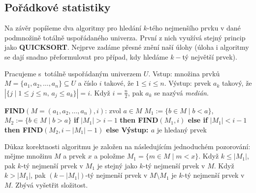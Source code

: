 \documentclass[a4paper,12pt]{article}
\begin{document}
\subsection{Pořádkové statistiky}

Na závěr popíšeme dva algoritmy pro hledání $
k$-tého 
nejmenší\-ho prvku v dané podmnožině totálně 
uspořádané\-ho univerza. Prv\-ní z nich využívá  
stejný princip jako {\bf QUICKSORT}. Nejprve zadáme 
přesné zně\-ní naší úlohy (úloha i algoritmy se dají 
snadno přeformulovat pro případ, kdy hledáme $k-$tý 
největší prvek).

Pracujeme s~totálně uspořádaným univerzem $
U$.\newline 
Vstup: množina prvků $M=\{a_1,a_2,\dots,a_n\}\subseteq 
U$ a číslo $i$ takové, 
že $1\le i\le n$.\newline 
Výstup: prvek $a_k$ takový, že 
$|\{j\mid 1\le j\le n,\,a_j\le a_k\}|=i$.\newline 
Když $i=\frac n2$, pak $a_k$ se nazývá \emph{medián}.

{\bf FIND$(M=(a_1,a_2,\dots,a_n),i)$}:\newline 
zvol $a\in M$\newline
$M_1:=\{b\in M\mid b<a\}$, 
$M_2:=\{b\in M\mid b>a\}$\newline 
{\bf if} $|M_1|>i-1$ {\bf then\newline 
\phantom{{\rm ---}}FIND$(M_1,i)$\newline 
else\newline 
\phantom{{\rm ---}}if} $|M_1|<i-1$ {\bf then\newline 
\phantom{{\rm ------}}FIND$(M_2,i-|M_1|-1)$\newline 
\phantom{{\rm ---}}else\newline 
\phantom{{\rm------}}Výstup: $a$} je hledaný prvek\newline 
\phantom{---}{\bf endif\newline 
endif}

Důkaz korektnosti algoritmu je založen na následujícím 
jednoduchém pozorování: mějme množinu $M$ a prvek $
x$ a 
položme $M_1=\{m\in M\mid m<x\}$. Když $k\le |M_1|$, pak $k$-tý 
nejmenší 
prvek v $M_1$ je stejný jako $k$-tý nejmenší prvek v $
M$. Když 
$k>|M_1|$, pak $(k-|M_1|)$-tý nejmenší prvek v $M\setminus 
M_1$ je $k$-tý 
nejmenší prvek v $M$.  
Zbývá vyšetřit složitost.
\end{document}
